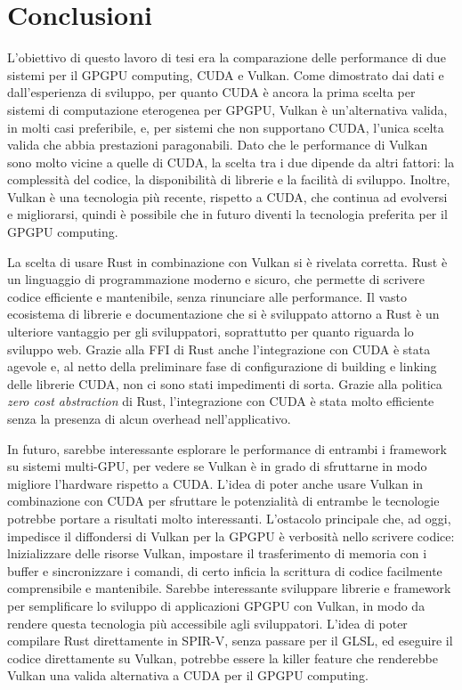 \chapter{Conclusioni}
\label{sec:conclusion}

L'obiettivo di questo lavoro di tesi era la comparazione delle performance di due sistemi per il \gls{GPGPU} computing, \gls{CUDA} e Vulkan. Come dimostrato dai dati e dall'esperienza di sviluppo, per quanto \gls{CUDA} è ancora la prima scelta per sistemi di computazione eterogenea per \gls{GPGPU}, Vulkan è un'alternativa valida, in molti casi preferibile, e, per sistemi che non supportano \gls{CUDA}, l'unica scelta valida che abbia prestazioni paragonabili. Dato che le performance di Vulkan sono molto vicine a quelle di \gls{CUDA}, la scelta tra i due dipende da altri fattori: la complessità del codice, la disponibilità di librerie e la facilità di sviluppo. Inoltre, Vulkan è una tecnologia più recente, rispetto a \gls{CUDA}, che continua ad evolversi e migliorarsi, quindi è possibile che in futuro diventi la tecnologia preferita per il \gls{GPGPU} computing.

La scelta di usare Rust in combinazione con Vulkan si è rivelata corretta. Rust è un linguaggio di programmazione moderno e sicuro, che permette di scrivere codice efficiente e mantenibile, senza rinunciare alle performance. Il vasto ecosistema di librerie e documentazione che si è sviluppato attorno a Rust è un ulteriore vantaggio per gli sviluppatori, soprattutto per quanto riguarda lo sviluppo web. Grazie alla \gls{FFI} di Rust anche l'integrazione con \gls{CUDA} è stata agevole e, al netto della preliminare fase di configurazione di building e linking delle librerie \gls{CUDA}, non ci sono stati impedimenti di sorta. Grazie alla politica \textit{zero cost abstraction} di Rust, l'integrazione con \gls{CUDA} è stata molto efficiente senza la presenza di alcun overhead nell'applicativo.

In futuro, sarebbe interessante esplorare le performance di entrambi i framework su sistemi multi-GPU, per vedere se Vulkan è in grado di sfruttarne in modo migliore l'hardware rispetto a \gls{CUDA}. L'idea di poter anche usare Vulkan in combinazione con \gls{CUDA} per sfruttare le potenzialità di entrambe le tecnologie potrebbe portare a risultati molto interessanti.
L'ostacolo principale che, ad oggi, impedisce il diffondersi di Vulkan per la \gls{GPGPU} è verbosità nello scrivere codice: lnizializzare delle risorse Vulkan, impostare il trasferimento di memoria con i buffer e sincronizzare i comandi, di certo inficia la scrittura di codice facilmente comprensibile e mantenibile. Sarebbe interessante sviluppare librerie e framework per semplificare lo sviluppo di applicazioni \gls{GPGPU} con Vulkan, in modo da rendere questa tecnologia più accessibile agli sviluppatori. L'idea di poter compilare Rust direttamente in \gls{SPIR-V}, senza passare per il \gls{GLSL}, ed eseguire il codice direttamente su Vulkan, potrebbe essere la killer feature che renderebbe Vulkan una valida alternativa a \gls{CUDA} per il \gls{GPGPU} computing.
